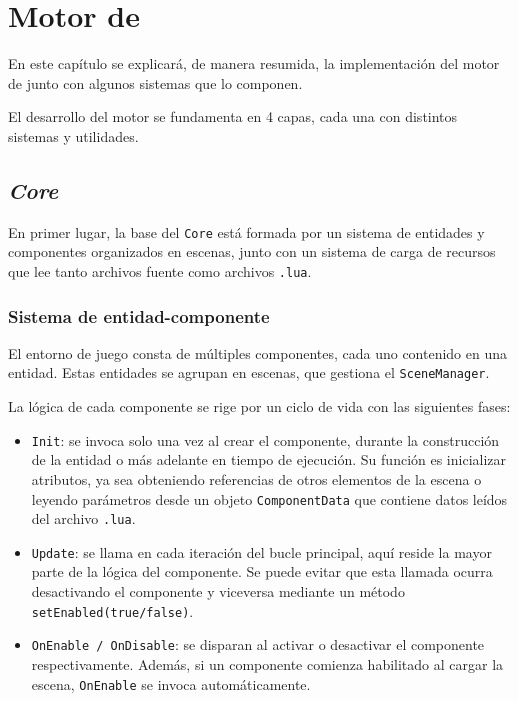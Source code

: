 \chapter{Motor de \baker}
\label{cap:motor}



\begin{resumen}
En este capítulo se explicará, de manera resumida, la implementación del motor de \baker{} junto con algunos sistemas que lo componen.
\end{resumen}

El desarrollo del motor se fundamenta en 4 capas, cada una con distintos sistemas y utilidades. 

\section{\textit{Core}}
En primer lugar, la base del \texttt{Core} está formada por un sistema de entidades y componentes organizados en escenas, junto con un sistema de carga de recursos que lee tanto archivos fuente como archivos \texttt{.lua}.

\subsection{Sistema de entidad-componente}
El entorno de juego consta de múltiples componentes, cada uno contenido en una entidad. Estas entidades se agrupan en escenas, que gestiona el \texttt{SceneManager}.

\smallskip

La lógica de cada componente se rige por un ciclo de vida con las siguientes fases: 

\begin{itemize}
	\item \texttt{Init}: se invoca solo una vez al crear el componente, durante la construcción de la entidad o más adelante en tiempo de ejecución. Su función es inicializar atributos, ya sea obteniendo referencias de otros elementos de la escena o leyendo parámetros desde un objeto \texttt{ComponentData} que contiene datos leídos del archivo \texttt{.lua}.
	\item \texttt{Update}: se llama en cada iteración del bucle principal, aquí reside la mayor parte de la lógica del componente. Se puede evitar que esta llamada ocurra desactivando el componente y viceversa mediante un método \texttt{setEnabled(true/false)}.
	\item \texttt{OnEnable / OnDisable}: se disparan al activar o desactivar el componente respectivamente. Además, si un componente comienza habilitado al cargar la escena, \texttt{OnEnable} se invoca automáticamente.
\end{itemize}

